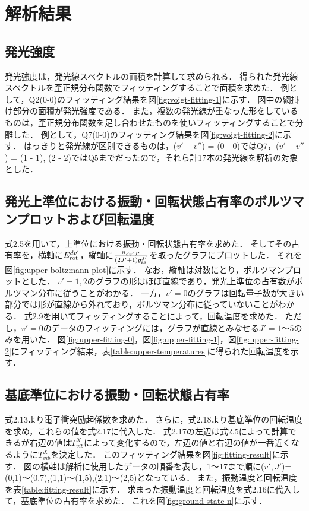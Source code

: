 \chapter{解析結果}

\section{発光強度}
発光強度は，発光線スペクトルの面積を計算して求められる．
得られた発光線スペクトルを歪正規分布関数でフィッティングすることで面積を求めた．
例として，Q2(0-0)のフィッティング結果を図\ref{fig:voigt-fitting-1}に示す．
図中の網掛け部分の面積が発光強度である．
また，複数の発光線が重なった形をしているものは，歪正規分布関数を足し合わせたものを使いフィッティングすることで分離した．
例として，Q7(0-0)のフィッティング結果を図\ref{fig:voigt-fitting-2}に示す．
はっきりと発光線が区別できるものは，($v'-v''$) = (0 - 0)ではQ7，($v'-v''$) = (1 - 1), (2 - 2)ではQ5までだったので，それら計17本の発光線を解析の対象とした．

\section{発光上準位における振動・回転状態占有率のボルツマンプロットおよび回転温度}
式2.5を用いて，上準位における振動・回転状態占有率を求めた．
そしてその占有率を，横軸に$E^{dv'}_{\rm rot}$，縦軸に$\frac{n_{dv'J'}}{\left( 2J'+1 \right) g^{J'}_{\rm as}}$を取ったグラフにプロットした．
それを図\ref{fig:upper-boltzmann-plot}に示す．
なお，縦軸は対数にとり，ボルツマンプロットとした．
$v'=1,2$のグラフの形はほぼ直線であり，発光上準位の占有数がボルツマン分布に従うことがわかる．
一方，$v'=0$のグラフは回転量子数が大きい部分では形が直線から外れており，ボルツマン分布に従っていないことがわかる．
式2.9を用いてフィッティングすることによって，回転温度を求めた．
ただし，$v'=0$のデータのフィッティングには，グラフが直線とみなせる$J'=1〜5$のみを用いた．
図\ref{fig:upper-fitting-0}，図\ref{fig:upper-fitting-1}，図\ref{fig:upper-fitting-2}にフィッティング結果，表\ref{table:upper-temperatures}に得られた回転温度を示す．

\section{基底準位における振動・回転状態占有率}
式2.13より電子衝突励起係数を求めた．
さらに，式2.18より基底準位の回転温度を求め，これらの値を式2.17に代入した．
式2.17の左辺は式2.5によって計算できるが右辺の値は$T^X_{vib}$によって変化するので，左辺の値と右辺の値が一番近くなるように$T^X_{vib}$を決定した．
このフィッティング結果を図\ref{fig:fitting-result}に示す．
図の横軸は解析に使用したデータの順番を表し，1〜17まで順に($v',J'$)=(0,1)〜(0.7),(1,1)〜(1,5),(2,1)〜(2,5)となっている．
また，振動温度と回転温度を表\ref{table:fitting-result}に示す．
求まった振動温度と回転温度を式2.16に代入して，基底準位の占有率を求めた．
これを図\ref{fig:ground-state-n}に示す．